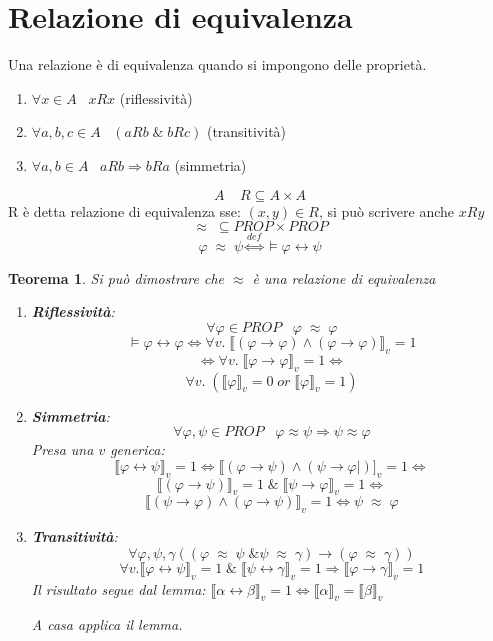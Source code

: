 \documentclass{article}
\newtheorem{theorem}{Teorema}
\theoremstyle{break}
\theoremstyle{break}
\theoremstyle{break}
\theoremstyle{break}
\begin{document}
\section{Relazione di equivalenza}
Una relazione è di equivalenza quando si impongono delle proprietà.
\begin{enumerate}
  \item \( \forall x \in A\;\;\; xRx \) (riflessività)
  \item \( \forall a,b,c \in A\;\;\; (aRb\;\&\;bRc) \) (transitività)
  \item \( \forall a,b \in A\;\;\; aRb  \Rightarrow bRa \) (simmetria)
\end{enumerate}
\[
  A\;\;\;\; R \subseteq A \times A
\] 
R è detta relazione di equivalenza sse: \( (x,y) \in R \), si può scrivere anche \( xRy \)  
\[
  \approx \; \subseteq PROP \times PROP
\] 
\[
  \varphi\;\approx\;\psi \stackrel{def}{\Leftrightarrow} \models \varphi \leftrightarrow \psi
\] 
\begin{theorem}
  Si può dimostrare che \( \approx \) è una relazione di equivalenza
  \begin{enumerate}
    \item \textbf{Riflessività}: \[
      \forall \varphi \in PROP \;\;\; \varphi\; \approx \; \varphi \] 
      \[
        \models \varphi \leftrightarrow \varphi \Leftrightarrow \forall v.\; \llbracket (\varphi \to \varphi) \wedge (\varphi \to \varphi)\rrbracket_v = 1
        \]\[
        \Leftrightarrow \forall v.\; \llbracket \varphi \to \varphi\rrbracket_v = 1 \Leftrightarrow
      \]  
      \[
        \forall v.\; (\llbracket \varphi\rrbracket_v=0\; or\; \llbracket \varphi\rrbracket_v=1)
      \] 
    \item \textbf{Simmetria}: \[
        \forall \varphi,\psi \in  PROP\;\;\; \varphi \approx \psi \Rightarrow \psi \approx \varphi
      \] 
      Presa una \( v \) generica:
      \[
        \llbracket \varphi \leftrightarrow \psi\rrbracket_v = 1 \Leftrightarrow \llbracket (\varphi \to \psi) \wedge (\psi \to \varphi|)]_v=1 \Leftrightarrow 
      \] 
      \[
        \llbracket (\varphi \to  \psi)\rrbracket_v=1\; \&\; \llbracket \psi \to \varphi\rrbracket_v=1 \Leftrightarrow
      \] 
      \[
        \llbracket (\psi \to \varphi) \wedge (\varphi \to \psi)\rrbracket_v=1 \Leftrightarrow \psi\; \approx\; \varphi
      \] 

    \item \textbf{Transitività}: \[
        \forall \varphi,\psi,\gamma ((\varphi\; \approx\; \psi\; \& \psi\; \approx\; \gamma) \to (\varphi\; \approx\; \gamma)) 
      \] 
      \[
        \forall v. \llbracket \varphi \leftrightarrow \psi\rrbracket_v=1 \;\&\; \llbracket \psi \leftrightarrow \gamma\rrbracket_v=1 \Rightarrow \llbracket \varphi \to \gamma\rrbracket_v=1
      \] 
      Il risultato segue dal lemma: \( \llbracket \alpha \leftrightarrow \beta\rrbracket_v=1 \Leftrightarrow \llbracket \alpha\rrbracket_v=\llbracket \beta\rrbracket_v \) 

      A casa applica il lemma.
  \end{enumerate}
\end{theorem}
\end{document}
